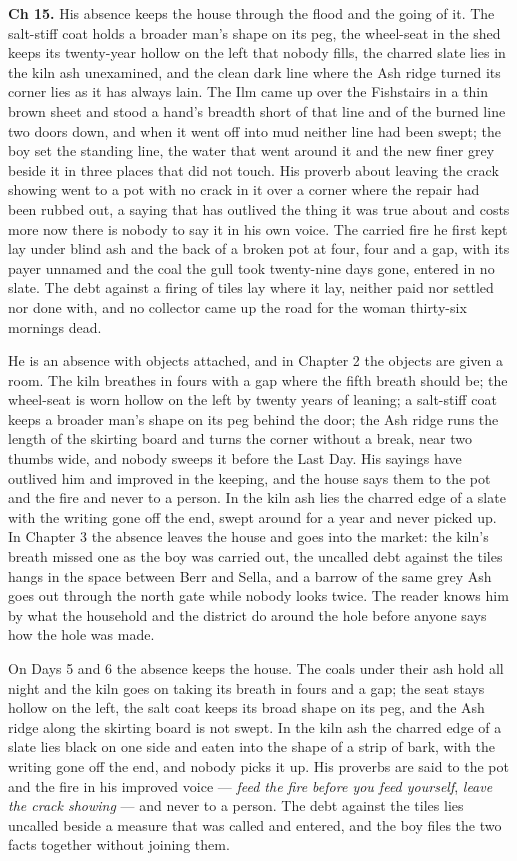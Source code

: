 \documentclass{design/chronicle}
\begin{document}
{\textbf{Ch 15.} His absence keeps the house through the flood and the going of it. The salt-stiff coat holds a broader man’s shape on its peg, the wheel-seat in the shed keeps its twenty-year hollow on the left that nobody fills, the charred slate lies in the kiln ash unexamined, and the clean dark line where the Ash ridge turned its corner lies as it has always lain. The Ilm came up over the Fishstairs in a thin brown sheet and stood a hand’s breadth short of that line and of the burned line two doors down, and when it went off into mud neither line had been swept; the boy set the standing line, the water that went around it and the new finer grey beside it in three places that did not touch. His proverb about leaving the crack showing went to a pot with no crack in it over a corner where the repair had been rubbed out, a saying that has outlived the thing it was true about and costs more now there is nobody to say it in his own voice. The carried fire he first kept lay under blind ash and the back of a broken pot at four, four and a gap, with its payer unnamed and the coal the gull took twenty-nine days gone, entered in no slate. The debt against a firing of tiles lay where it lay, neither paid nor settled nor done with, and no collector came up the road for the woman thirty-six mornings dead.

He is an absence with objects attached, and in Chapter 2 the objects are given a room. The kiln breathes in fours with a gap where the fifth breath should be; the wheel-seat is worn hollow on the left by twenty years of leaning; a salt-stiff coat keeps a broader man’s shape on its peg behind the door; the Ash ridge runs the length of the skirting board and turns the corner without a break, near two thumbs wide, and nobody sweeps it before the Last Day. His sayings have outlived him and improved in the keeping, and the house says them to the pot and the fire and never to a person. In the kiln ash lies the charred edge of a slate with the writing gone off the end, swept around for a year and never picked up. In Chapter 3 the absence leaves the house and goes into the market: the kiln’s breath missed one as the boy was carried out, the uncalled debt against the tiles hangs in the space between Berr and Sella, and a barrow of the same grey Ash goes out through the north gate while nobody looks twice. The reader knows him by what the household and the district do around the hole before anyone says how the hole was made.

On Days 5 and 6 the absence keeps the house. The coals under their ash hold all night and the kiln goes on taking its breath in fours and a gap; the seat stays hollow on the left, the salt coat keeps its broad shape on its peg, and the Ash ridge along the skirting board is not swept. In the kiln ash the charred edge of a slate lies black on one side and eaten into the shape of a strip of bark, with the writing gone off the end, and nobody picks it up. His proverbs are said to the pot and the fire in his improved voice --- \emph{feed the fire before you feed yourself}, \emph{leave the crack showing} --- and never to a person. The debt against the tiles lies uncalled beside a measure that was called and entered, and the boy files the two facts together without joining them.

}
\end{document}
